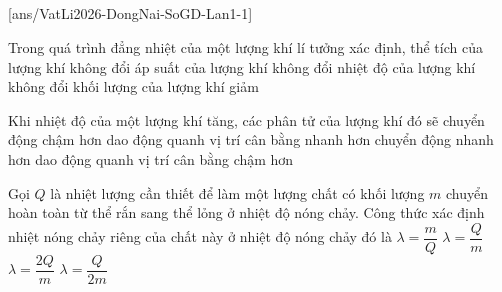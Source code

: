 \def\CheDo{solcolor}%
\def\tenchuong{Sở GD\&ĐT Đồng Nai -- Lần 1}
\def\thuonghieu{VẬT LÍ 12 -- Eduzy.com.vn}
\def\TachCauDS{1}
\def\TachCauLG{1}




	\noindent
	\subsection*{}
	\setcounter{ex}{0}
	[ans/VatLi2026-DongNai-SoGD-Lan1-1]

	\begin{ex}%
		Trong quá trình đẳng nhiệt của một lượng khí lí tưởng xác định,
		\choice
		{thể tích của lượng khí không đổi}
		{áp suất của lượng khí không đổi}
		{\True nhiệt độ của lượng khí không đổi}
		{khối lượng của lượng khí giảm}
	\end{ex}

	\begin{ex}%
		Khi nhiệt độ của một lượng khí tăng, các phân tử của lượng khí đó sẽ
		\choice
		{chuyển động chậm hơn}
		{dao động quanh vị trí cân bằng nhanh hơn}
		{\True chuyển động nhanh hơn}
		{dao động quanh vị trí cân bằng chậm hơn}
	\end{ex}

	\begin{ex}%
		Gọi $Q$ là nhiệt lượng cần thiết để làm một lượng chất có khối lượng $m$ chuyển hoàn toàn từ thể rắn sang thể lỏng ở nhiệt độ nóng chảy. Công thức xác định nhiệt nóng chảy riêng của chất này ở nhiệt độ nóng chảy đó là
		\choice
		{$\lambda=\dfrac{m}{Q}$}
		{\True $\lambda=\dfrac{Q}{m}$}
		{$\lambda=\dfrac{2Q}{m}$}
		{$\lambda=\dfrac{Q}{2m}$}
	\end{ex}

